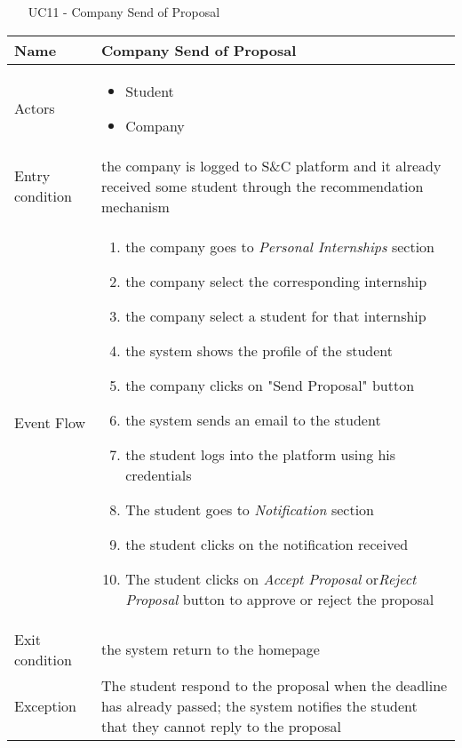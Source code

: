 				
			
				
				\begin{table} [H]
					\centering
						\begin{itemize}
						\item [UC11] - Company Send of Proposal
					\end{itemize}
					\begin{tabular}{|| P{7.5cm} | P{7.5cm} ||}
						\hline
						Name & Company Send of Proposal \\
						\hline
						Actors & \parbox{5cm}{\begin{itemize}
								\item Student
								\item Company
							\end{itemize}
						} \\
						\hline
						Entry condition & the company is logged to S\&C platform and it already received some student through the recommendation mechanism \\
						\hline
						Event Flow & \parbox{5cm}{\begin{enumerate}
								\item the company goes to \textit{Personal Internships} section
								\item the company select the corresponding internship 
								\item the company select a student for that internship
								\item the system shows the profile of the student
								\item the company clicks on "Send Proposal" button
								\item the system sends an email to the student
								\item the student logs into the platform using his credentials
								\item The student goes to \textit{Notification} 
								section 
								\item the student clicks on the notification 
								received 
								\item The student clicks on \textit{Accept 
									Proposal} or\textit{Reject Proposal}
								button to approve or reject the 
								proposal
						\end{enumerate}} \\
						\hline 
						Exit condition & the system return to the homepage \\
						\hline
						Exception & The student respond to the proposal when the deadline has already passed; the 
								system notifies the student that they 
								cannot reply to the proposal \\
						\hline
					\end{tabular}
				\end{table}
				
